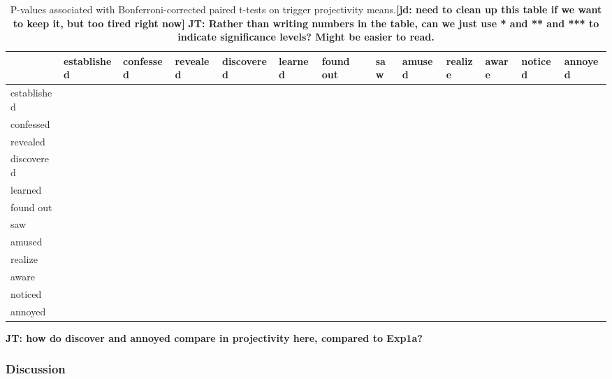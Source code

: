 \documentclass[11pt,fleqn]{article}
\newcommand{\6}{\mbox{$[\hspace*{-.6mm}[$}}
\newcommand{\9}{\mbox{$]\hspace*{-.6mm}]$}}
\newcommand{\jt}[1]{\textbf{\color{blue}JT: #1}}
\newcommand{\jd}[1]{\textbf{\color{Green}[jd: #1]}}
\begin{document}
\begin{table}[!h]
\begin{center}
\begin{tabular}{l l l l l l l l l l l l l}
\toprule
 &  established & confessed & revealed &  discovered &  learned & found out & saw & amused & realize & aware & noticed & annoyed \\
 \midrule
established & & & & & & & & & & & & \\ 
confessed & & & & & & & & & & & & \\ 
revealed & & & & & & & & & & & & \\ 
discovered & & & & & & & & & & & & \\ 
learned & & & & & & & & & & & & \\ 
found out & & & & & & & & & & & & \\ 
saw  & & & & & & & & & & & & \\ 
amused & & & & & & & & & & & & \\ 
realize  & & & & & & & & & & & & \\   
aware  & & & & & & & & & & & & \\ 
noticed    & & & & & & & & & & & & \\ 
annoyed   & & & & & & & & & & & & \\ 
\bottomrule
\end{tabular}

\caption{P-values associated with Bonferroni-corrected paired t-tests on trigger projectivity means.\jd{need to clean up this table if we want to keep it, but too tired right now} \jt{Rather than writing numbers in the table, can we just use * and ** and *** to indicate significance levels? Might be easier to read.}}
\label{tab:pairwise-1b}
\end{center}
\end{table}


%
%
%
%

\jt{how do discover and annoyed compare in projectivity here, compared to Exp1a?}


\subsubsection{Discussion}
\end{document}
